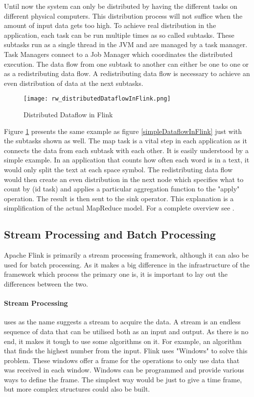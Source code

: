 Until now the system can only be distributed by having the different tasks on different physical computers. This distribution process will not suffice when the amount of input data gets too high. To achieve real distribution in the application, each task can be run multiple times as so called subtasks. These subtasks run as a single thread in the JVM and are managed by a task manager. Task Managers connect to a Job Manager which coordinates the distributed execution. The data flow from one subtask to another can either be one to one or as a redistributing data flow. A redistributing data flow is necessary to achieve an even distribution of data at the next subtasks.

\begin{figure}[h!]
    \centering
      \texttt{[image: rw\_distributedDataflowInFlink.png]}
      \caption{Distributed Dataflow in Flink \cite{ApacheFlinkParallelDataflowFigure}}
      \label{distributedDataflowInFlink}
\end{figure}

Figure \ref{distributedDataflowInFlink} presents the same example as figure \ref{simpleDataflowInFlink} just with the subtasks shown as well. The map task is a vital step in each application as it connects the data from each subtask with each other. It is easily understood by a simple example.
In an application that counts how often each word is in a text, it would only split the text at each space symbol. The redistributing data flow would then create an even distribution in the next node which specifies what to count by (id task) and applies a particular aggregation function to the "apply" operation. The result is then sent to the sink operator. This explanation is a simplification of the actual MapReduce model. For a complete overview see \cite{dean2008mapreduce}.

\subsection{Stream Processing and Batch Processing}

Apache Flink is primarily a stream processing framework, although it can also be used for batch processing. As it makes a big difference in the infrastructure of the framework which process the primary one is, it is important to lay out the differences between the two.

\paragraph{Stream Processing} uses as the name suggests a stream to acquire the data. A stream is an endless sequence of data that can be utilised both as an input and output. As there is no end, it makes it tough to use some algorithms on it. For example, an algorithm that finds the highest number from the input. Flink uses "Windows" to solve this problem. These windows offer a frame for the operations to only use data that was received in each window. Windows can be programmed and provide various ways to define the frame. The simplest way would be just to give a time frame, but more complex structures could also be built.

